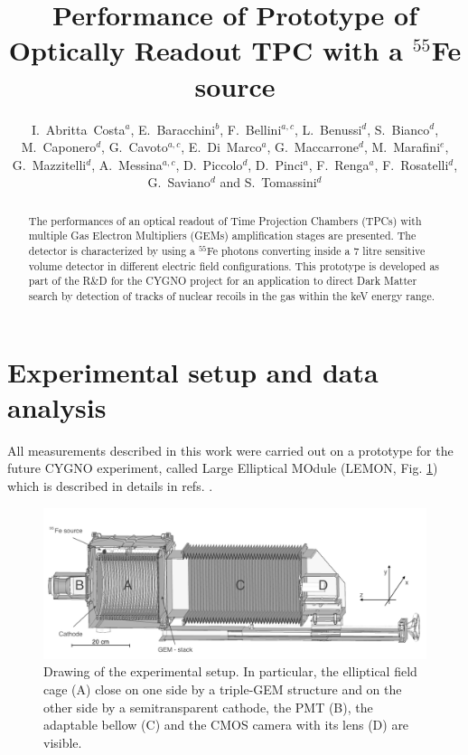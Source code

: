 \documentclass[a4paper]{jpconf}
\begin{document}
\title{Performance of Prototype of Optically Readout TPC with a $^{55}$Fe source}

\author{
{I.~Abritta~Costa}$^{a}$,
{E.~Baracchini}$^{b}$,
{F.~Bellini}$^{a,c}$,
{L.~Benussi}$^{d}$,
{S.~Bianco}$^{d}$,
{M.~Caponero}$^{d}$,
{G.~Cavoto}$^{a,c}$,
{E.~Di~Marco}$^{a}$,
{G.~Maccarrone}$^{d}$,
{M.~Marafini}$^{e}$,
{G.~Mazzitelli}$^{d}$,
{A.~Messina}$^{a,c}$,
{D.~Piccolo}$^{d}$,
{D.~Pinci}$^{a}$,
{F.~Renga}$^{a}$,
{F.~Rosatelli}$^{d}$,
{G.~Saviano}$^{d}$ and
{S.~Tomassini}$^{d}$
\\
\address{$^a$ Istituto~Nazionale~di~Fisica~Nucleare,  
 Sezione di Roma, I-00185, Italy}
\address{$^b$ Gran~Sasso~Science~Institute~L'Aquila, I-67100, Italy}
\address{$^c$ Dipartimento di Fisica, Sapienza Universit\`a di Roma, I-00185, Italy} 
\address{$^d$ Istituto Nazionale di Fisica Nucleare,  Laboratori Nazionali di Frascati, I-00040, Italy}
\address{$^e$ Museo Storico della Fisica e Centro Studi e Ricerche "Enrico Fermi", Piazza del Viminale 1, Roma, I-00184, Italy}
}


\begin{abstract}
The performances of an optical readout of Time Projection Chambers
(TPCs) with multiple Gas Electron Multipliers (GEMs) amplification
stages are presented.  The detector is characterized by using a
$^{55}$Fe photons converting inside a 7 litre sensitive volume
detector in different electric field configurations.  This prototype
is developed as part of the R\&D for the CYGNO project for an
application to direct Dark Matter search by detection of tracks of
nuclear recoils in the gas within the keV energy range.
\end{abstract}

\section{Experimental setup and data analysis}
\label{sec:daq}

All measurements described in this work were carried out on a
prototype for the future CYGNO experiment, called Large Elliptical
MOdule (LEMON, Fig. \ref{fig:lemon}) which is described in details in
refs. \cite{bib:eps, bib:ieee17, bib:ieee18}.

\begin{figure}[htbp]
\centering
\includegraphics[width=.85\textwidth]{sex_bw-2.png}
\caption{Drawing of the experimental setup.  In particular, the
  elliptical field cage (A) close on one side by a triple-GEM
  structure and on the other side by a semitransparent cathode, the
  PMT (B), the adaptable bellow (C) and the CMOS camera with its lens
  (D) are visible.}
\label{fig:lemon}
\end{figure}
\end{document}
